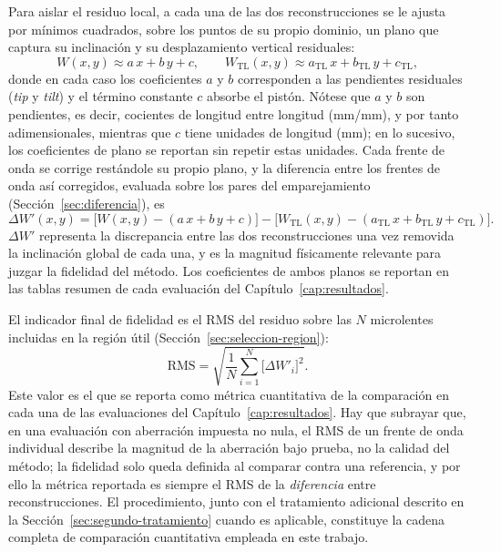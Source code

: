 \documentclass[letterpaper,12pt,oneside]{book}
\makeatletter
\renewcommand\subsection{\@startsection{subsection}{2}{\z@}{-3.25ex\@plus -1ex \@minus -.2ex}{1.5ex \@plus .2ex}{\normalfont\large\bfseries\raggedright}}
\makeatother
\begin{document}
Para aislar el residuo local, a cada una de las dos reconstrucciones se le ajusta por mínimos cuadrados, sobre los puntos de su propio dominio, un plano que captura su inclinación y su desplazamiento vertical residuales:
\begin{equation}
W(x,y) \approx a\,x + b\,y + c, \qquad W_\text{TL}(x,y) \approx a_\text{TL}\,x + b_\text{TL}\,y + c_\text{TL},
\label{eq:plano-ajuste}
\end{equation}
donde en cada caso los coeficientes $a$ y $b$ corresponden a las pendientes residuales (\textit{tip} y \textit{tilt}) y el término constante $c$ absorbe el pistón. Nótese que $a$ y $b$ son pendientes, es decir, cocientes de longitud entre longitud (mm/mm), y por tanto adimensionales, mientras que $c$ tiene unidades de longitud (mm); en lo sucesivo, los coeficientes de plano se reportan sin repetir estas unidades. Cada frente de onda se corrige restándole su propio plano, y la diferencia entre los frentes de onda así corregidos, evaluada sobre los pares del emparejamiento (Sección~\ref{sec:diferencia}), es
\begin{equation}
\Delta W'(x,y) = \bigl[W(x,y) - (a\,x + b\,y + c)\bigr] - \bigl[W_\text{TL}(x,y) - (a_\text{TL}\,x + b_\text{TL}\,y + c_\text{TL})\bigr].
\label{eq:residuo}
\end{equation}
$\Delta W'$ representa la discrepancia entre las dos reconstrucciones una vez removida la inclinación global de cada una, y es la magnitud físicamente relevante para juzgar la fidelidad del método. Los coeficientes de ambos planos se reportan en las tablas resumen de cada evaluación del Capítulo~\ref{cap:resultados}.

\subsection{Indicador escalar (RMS)}\label{sec:rms}

El indicador final de fidelidad es el RMS del residuo sobre las $N$ microlentes incluidas en la región útil (Sección~\ref{sec:seleccion-region}):
\begin{equation}
\text{RMS} = \sqrt{\frac{1}{N} \sum_{i=1}^{N} \bigl[\Delta W'_i\bigr]^2}.
\label{eq:rms}
\end{equation}
Este valor es el que se reporta como métrica cuantitativa de la comparación en cada una de las evaluaciones del Capítulo~\ref{cap:resultados}. Hay que subrayar que, en una evaluación con aberración impuesta no nula, el RMS de un frente de onda individual describe la magnitud de la aberración bajo prueba, no la calidad del método; la fidelidad solo queda definida al comparar contra una referencia, y por ello la métrica reportada es siempre el RMS de la \emph{diferencia} entre reconstrucciones. El procedimiento, junto con el tratamiento adicional descrito en la Sección~\ref{sec:segundo-tratamiento} cuando es aplicable, constituye la cadena completa de comparación cuantitativa empleada en este trabajo.
\end{document}
